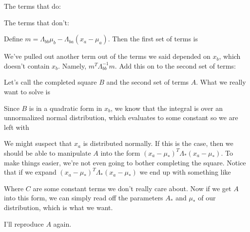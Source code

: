 \documentclass[12pt]{article}
\begin{document}
The terms that do:

The terms that don't:

Define $m = \Lambda_{bb}\mu_b - \Lambda_{ba} (x_a-\mu_a)$. Then the first set of terms is

We've pulled out another term out of the terms we said depended on $x_b$, which doesn't contain $x_b$. Namely, $m^T \Lambda_{bb}^{-1} m$. Add this on to the second set of terms:


Let's call the completed square $B$ and the second set of terms $A$. What we really want to solve is


Since $B$ is in a quadratic form in $x_b$, we know that the integral is over an unnormalized normal distribution, which evaluates to some constant so we are left with

We might suspect that $x_a$ is distributed normally. If this is the case, then we should be able to manipulate $A$ into the form $(x_a - \mu_*)^T \Lambda_* (x_a - \mu_*)$. To make things easier, we're not even going to bother completing the square. Notice that if we expand $(x_a - \mu_*)^T \Lambda_* (x_a - \mu_*)$ we end up with something like


Where $C$ are some constant terms we don't really care about. Now if we get $A$ into this form, we can simply read off the parameters $A_*$ and $\mu_*$ of our distribution, which is what we want.

I'll reproduce $A$ again.
\end{document}
